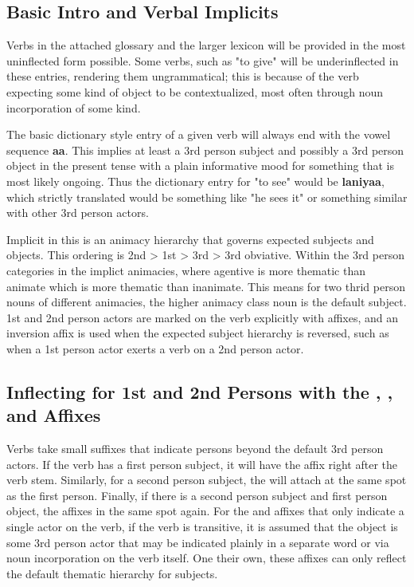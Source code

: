 \subsection{Basic Intro and Verbal Implicits}
Verbs in the attached glossary and the larger lexicon will be provided in the most uninflected form possible. Some verbs, such as "to give" will be underinflected in these entries, rendering them ungrammatical; this is because of the verb expecting some kind of object to be contextualized, most often through noun incorporation of some kind.
\par
The basic dictionary style entry of a given verb will always end with the vowel sequence \textbf{aa}. This implies at least a 3rd person subject and possibly a 3rd person object in the present tense with a plain informative mood for something that is most likely ongoing. Thus the dictionary entry for "to see" would be \textbf{laniyaa}, which strictly translated would be something like "he sees it" or something similar with other 3rd person actors.
\par
Implicit in this is an animacy hierarchy that governs expected subjects and objects. This ordering is 2nd > 1st > 3rd > 3rd obviative. Within the 3rd person categories in the implict animacies, where agentive is more thematic than animate which is more thematic than inanimate. This means for two thrid person nouns of different animacies, the higher animacy class noun is the default subject. 1st and 2nd person actors are marked on the verb explicitly with affixes, and an inversion affix is used when the expected subject hierarchy is reversed, such as when a 1st person actor exerts a verb on a 2nd person actor.

\subsection{Inflecting for 1st and 2nd Persons with the \suffixtext{\verbfirst}, \suffixtext{\verbsecond}, and \suffixtext{\verbonetwo} Affixes}
Verbs take small suffixes that indicate persons beyond the default 3rd person actors. If the verb has a first person subject, it will have the \suffixtext{\verbfirst} affix right after the verb stem. Similarly, for a second person subject, the \suffixtext{\verbsecond} will attach at the same spot as the first person. Finally, if there is a second person subject and first person object, the \suffixtext{\verbonetwo} affixes in the same spot again. For the \suffixtext{\verbfirst} and \suffixtext{\verbsecond} affixes that only indicate a single actor on the verb, if the verb is transitive, it is assumed that the object is some 3rd person actor that may be indicated plainly in a separate word or via noun incorporation on the verb itself. One their own, these affixes can only reflect the default thematic hierarchy for subjects.

